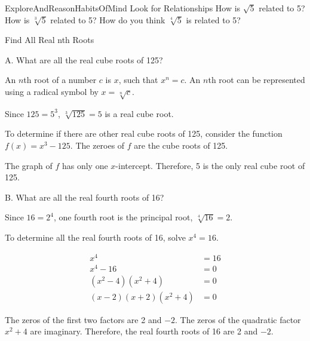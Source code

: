 \documentclass{article}
\newenvironment{example}[1]{}{}         %
\newenvironment{te-addendum}[2]{}{}     %
\newcommand{\answer}[1]{}               %
\begin{document}
\begin{te-addendum}{ExploreAndReason}{HabitsOfMind}
Look for Relationships How is \(\sqrt{5}\) related to 5? How is \(\sqrt[3]{5}\) related to 5? How do you think \(\sqrt[4]{5}\) is related to 5?

\answer{\((\sqrt{5})^2=5\); \((\sqrt[3]{5})^3=5\); \((\sqrt[4]{5})^4=5\).}
\end{te-addendum}

\begin{example}{1}
Find All Real nth Roots

A. What are all the real cube roots of 125?

An \(n\)th root of a number \(c\) is \(x\), such that \(x^n=c\). An \(n\)th root can be represented using a radical symbol by \(x=\sqrt[n]{c}\).

Since \(125=5^3\), \(\sqrt[3]{125}=5\) is a real cube root.

To determine if there are other real cube roots of 125, consider the function \(f(x)=x^3-125\). The zeroes of \(f\) are the cube roots of 125.


The graph of \(f\) has only one \(x\)-intercept. Therefore, 5 is the only real cube root of 125.

B. What are all the real fourth roots of 16?

Since \(16=2^4\), one fourth root is the principal root, \(\sqrt[4]{16}=2\).

To determine all the real fourth roots of 16, solve \(x^4=16\).

\[
\begin{aligned}
x^4&=16\\
x^4-16&=0\\
(x^2-4)(x^2+4)&=0\\
(x-2)(x+2)(x^2+4)&=0
\end{aligned}
\]

The zeros of the first two factors are 2 and \(-2\). The zeros of the quadratic factor \(x^2+4\) are imaginary. Therefore, the real fourth roots of 16 are 2 and \(-2\).

\answer{A. 5 is the only real cube root of 125. B. The real fourth roots of 16 are 2 and \(-2\).}
\end{example}
\end{document}
